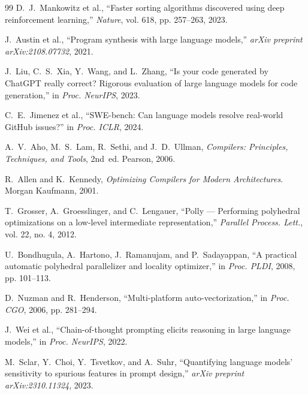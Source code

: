 \begin{thebibliography}{99}
D.~J.~Mankowitz et al., ``Faster sorting algorithms discovered using deep reinforcement learning,'' \textit{Nature}, vol. 618, pp. 257--263, 2023.

J.~Austin et al., ``Program synthesis with large language models,'' \textit{arXiv preprint arXiv:2108.07732}, 2021.

J.~Liu, C.~S.~Xia, Y.~Wang, and L.~Zhang, ``Is your code generated by ChatGPT really correct? Rigorous evaluation of large language models for code generation,'' in \textit{Proc. NeurIPS}, 2023.

C.~E.~Jimenez et al., ``SWE-bench: Can language models resolve real-world GitHub issues?'' in \textit{Proc. ICLR}, 2024.

A.~V.~Aho, M.~S.~Lam, R.~Sethi, and J.~D.~Ullman, \textit{Compilers: Principles, Techniques, and Tools}, 2nd~ed. Pearson, 2006.

R.~Allen and K.~Kennedy, \textit{Optimizing Compilers for Modern Architectures}. Morgan Kaufmann, 2001.

T.~Grosser, A.~Groesslinger, and C.~Lengauer, ``Polly --- Performing polyhedral optimizations on a low-level intermediate representation,'' \textit{Parallel Process. Lett.}, vol. 22, no. 4, 2012.

U.~Bondhugula, A.~Hartono, J.~Ramanujam, and P.~Sadayappan, ``A practical automatic polyhedral parallelizer and locality optimizer,'' in \textit{Proc. PLDI}, 2008, pp. 101--113.

D.~Nuzman and R.~Henderson, ``Multi-platform auto-vectorization,'' in \textit{Proc. CGO}, 2006, pp. 281--294.

J.~Wei et al., ``Chain-of-thought prompting elicits reasoning in large language models,'' in \textit{Proc. NeurIPS}, 2022.

M.~Sclar, Y.~Choi, Y.~Tsvetkov, and A.~Suhr, ``Quantifying language models' sensitivity to spurious features in prompt design,'' \textit{arXiv preprint arXiv:2310.11324}, 2023.

\end{thebibliography}
